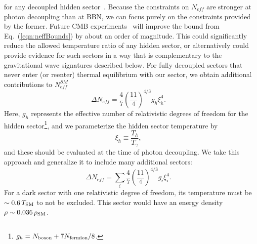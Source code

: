 \documentclass[nofootinbib,twocolumn,preprintnumbers]{revtex4-1}
\begin{document}
for any  decoupled hidden sector~\cite{Arkani-Hamed:2016rle}. Because the constraints on $N_{eff}$ are stronger at photon decoupling than at BBN, we can focus purely on the constraints provided by the former.
Future CMB experiments~\cite{Abazajian:2016yjj} will improve the bound from Eq.~(\ref{eqn:neffBounds}) by about an order of magnitude. This could significantly reduce the allowed temperature ratio of any hidden sector, or alternatively could provide evidence for such sectors in a way that is complementary to the gravitational wave signatures described below. 
For fully decoupled sectors that never enter (or reenter) thermal equilibrium with our sector, we obtain additional contributions to $N^{SM}_{eff}$ \cite{Breitbach:2018ddu}
\begin{equation}\label{eqn:DeltaNeff1hs}
\Delta N_{eff} = \frac{4}{7}\left(\frac{11}{4}\right)^{4/3}g_h \xi_h^4.
\end{equation} 
Here, $g_h$ represents the effective number of relativistic degrees of freedom for the hidden sector\footnote{$g_h = N_{\rm boson} + 7 N_{\rm fermion}/8$.}, and we parameterize the hidden sector temperature by~\cite{Breitbach:2018ddu}
\begin{equation}
\xi_h \equiv  \frac{T_{h}}{T_{\gamma}},
\label{eq:xi}
\end{equation}
and these should be evaluated at the time of photon decoupling. 
%
%
We take this approach and generalize it to include many additional sectors:
\begin{equation}\label{eqn:DeltaNeff}
\Delta N_{eff} = \sum_i \frac{4}{7}\left(\frac{11}{4}\right)^{4/3}g_{i} \xi^4_{i}.
\end{equation} 
For a dark sector with one relativistic degree of freedom, its temperature must be $\sim 0.6\, T_{\rm SM}$ to not be excluded. This sector would have an energy density $\rho \sim 0.036\, \rho_{\rm SM}$. 
\end{document}
